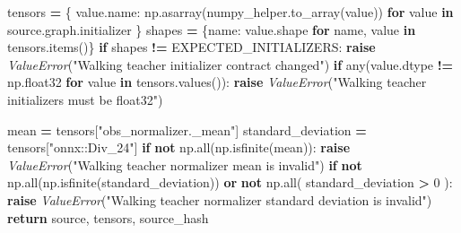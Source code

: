 \documentclass[
  american,
  11pt,
  letterpaper,
]{article}
\newenvironment{Shaded}{\begin{snugshade}}{\end{snugshade}}
\newcommand{\BuiltInTok}[1]{#1}
\newcommand{\ControlFlowTok}[1]{\textcolor[rgb]{0.13,0.29,0.53}{\textbf{#1}}}
\newcommand{\DecValTok}[1]{\textcolor[rgb]{0.00,0.00,0.81}{#1}}
\newcommand{\KeywordTok}[1]{\textcolor[rgb]{0.13,0.29,0.53}{\textbf{#1}}}
\newcommand{\NormalTok}[1]{#1}
\newcommand{\OperatorTok}[1]{\textcolor[rgb]{0.81,0.36,0.00}{\textbf{#1}}}
\newcommand{\PreprocessorTok}[1]{\textcolor[rgb]{0.56,0.35,0.01}{\textit{#1}}}
\newcommand{\StringTok}[1]{\textcolor[rgb]{0.31,0.60,0.02}{#1}}
\renewenvironment{Shaded}{\par\smallskip}{\par\smallskip}
\begin{document}
\begin{Shaded}
\begin{Highlighting}[]
\NormalTok{    tensors }\OperatorTok{=}\NormalTok{ \{}
\NormalTok{        value.name: np.asarray(numpy\_helper.to\_array(value))}
        \ControlFlowTok{for}\NormalTok{ value }\KeywordTok{in}\NormalTok{ source.graph.initializer}
\NormalTok{    \}}
\NormalTok{    shapes }\OperatorTok{=}\NormalTok{ \{name: value.shape }\ControlFlowTok{for}\NormalTok{ name, value }\KeywordTok{in}\NormalTok{ tensors.items()\}}
    \ControlFlowTok{if}\NormalTok{ shapes }\OperatorTok{!=}\NormalTok{ EXPECTED\_INITIALIZERS:}
        \ControlFlowTok{raise} \PreprocessorTok{ValueError}\NormalTok{(}\StringTok{"Walking teacher initializer contract changed"}\NormalTok{)}
    \ControlFlowTok{if} \BuiltInTok{any}\NormalTok{(value.dtype }\OperatorTok{!=}\NormalTok{ np.float32 }\ControlFlowTok{for}\NormalTok{ value }\KeywordTok{in}\NormalTok{ tensors.values()):}
        \ControlFlowTok{raise} \PreprocessorTok{ValueError}\NormalTok{(}\StringTok{"Walking teacher initializers must be float32"}\NormalTok{)}

\NormalTok{    mean }\OperatorTok{=}\NormalTok{ tensors[}\StringTok{"obs\_normalizer.\_mean"}\NormalTok{]}
\NormalTok{    standard\_deviation }\OperatorTok{=}\NormalTok{ tensors[}\StringTok{"onnx::Div\_24"}\NormalTok{]}
    \ControlFlowTok{if} \KeywordTok{not}\NormalTok{ np.}\BuiltInTok{all}\NormalTok{(np.isfinite(mean)):}
        \ControlFlowTok{raise} \PreprocessorTok{ValueError}\NormalTok{(}\StringTok{"Walking teacher normalizer mean is invalid"}\NormalTok{)}
    \ControlFlowTok{if} \KeywordTok{not}\NormalTok{ np.}\BuiltInTok{all}\NormalTok{(np.isfinite(standard\_deviation)) }\KeywordTok{or} \KeywordTok{not}\NormalTok{ np.}\BuiltInTok{all}\NormalTok{(}
\NormalTok{        standard\_deviation }\OperatorTok{\textgreater{}} \DecValTok{0}
\NormalTok{    ):}
        \ControlFlowTok{raise} \PreprocessorTok{ValueError}\NormalTok{(}\StringTok{"Walking teacher normalizer standard deviation is invalid"}\NormalTok{)}
    \ControlFlowTok{return}\NormalTok{ source, tensors, source\_hash}



\end{Highlighting}
\end{Shaded}
\end{document}
